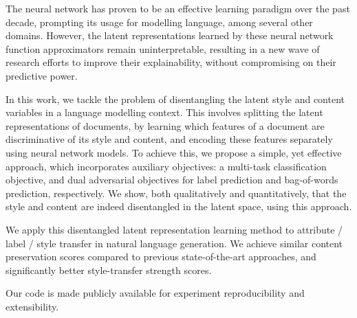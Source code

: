 The neural network has proven to be an effective learning paradigm over the past decade, prompting its usage for modelling language, among several other domains. However, the latent representations learned by these neural network function approximators remain uninterpretable, resulting in a new wave of research efforts to improve their explainability, without compromising on their predictive power.

In this work, we tackle the problem of disentangling the latent style and content variables in a language modelling context. This involves splitting the latent representations of documents, by learning which features of a document are discriminative of its style and content, and encoding these features separately using neural network models. To achieve this, we propose a simple, yet effective approach, which incorporates auxiliary objectives: a multi-task classification objective, and dual adversarial objectives for label prediction and bag-of-words prediction, respectively. We show, both qualitatively and quantitatively, that the style and content are indeed disentangled in the latent space, using this approach.

We apply this disentangled latent representation learning method to attribute / label / style transfer in natural language generation. We achieve similar content preservation scores compared to previous state-of-the-art approaches, and significantly better style-transfer strength scores.

Our code is made publicly available for experiment reproducibility and extensibility.

